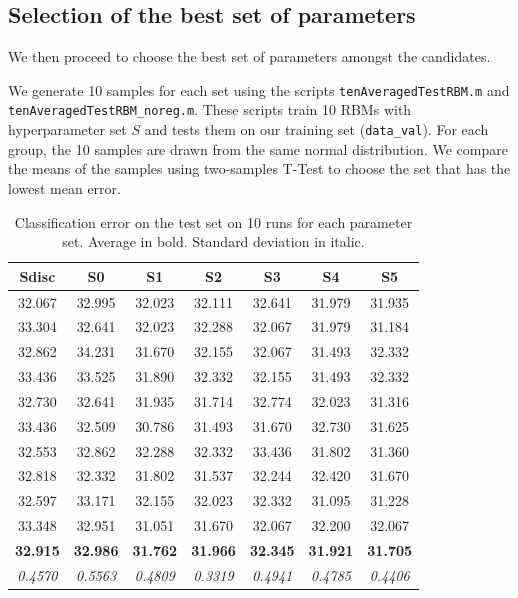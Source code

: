 \documentclass[10pt,a4paper, twocolumn]{article}
\theoremstyle{definition}
\begin{document}
\subsection{Selection of the best set of parameters}
We then proceed to choose the best set of parameters amongst the candidates.

We generate 10 samples for each set using the scripts \texttt{tenAveragedTestRBM.m} and \texttt{tenAveragedTestRBM\_noreg.m}. These scripts train 10 RBMs with hyperparameter set $S$ and tests them on our training set (\texttt{data\_val}). For each group, the 10 samples are drawn from the same normal distribution. We compare the means of the samples using two-samples T-Test to choose the set that has the lowest mean error.

\begin{table}
\resizebox{\columnwidth}{!} {
\begin{tabular}{|c|c|c|c|c|c|c|}
\hline
Sdisc & S0 & S1 & S2 & S3 & S4 & S5\\
\hline
32.067 & 32.995 & 32.023 & 32.111 & 32.641 & 31.979 & 31.935\\
33.304 & 32.641 & 32.023 & 32.288 & 32.067 & 31.979 & 31.184\\
32.862 & 34.231 & 31.670 & 32.155 & 32.067 & 31.493 & 32.332\\
33.436 & 33.525 & 31.890 & 32.332 & 32.155 & 31.493 & 32.332\\
32.730 & 32.641 & 31.935 & 31.714 & 32.774 & 32.023 & 31.316\\
33.436 & 32.509 & 30.786 & 31.493 & 31.670 & 32.730 & 31.625\\
32.553 & 32.862 & 32.288 & 32.332 & 33.436 & 31.802 & 31.360\\
32.818 & 32.332 & 31.802 & 31.537 & 32.244 & 32.420 & 31.670\\
32.597 & 33.171 & 32.155 & 32.023 & 32.332 & 31.095 & 31.228\\
33.348 & 32.951 & 31.051 & 31.670 & 32.067 & 32.200 & 32.067\\
\hline
\textbf{32.915} & \textbf{32.986} & \textbf{31.762} & \textbf{31.966} & \textbf{32.345} & \textbf{31.921} & \textbf{31.705}\\
\hline
\textit{0.4570}  &  \textit{0.5563}  &  \textit{0.4809}  &  \textit{0.3319} &   \textit{0.4941}  &  \textit{0.4785} &   \textit{0.4406}\\
\hline
\end{tabular}
}
\caption{Classification error on the test set on 10 runs for each parameter set. Average in bold. Standard deviation in italic.}
\end{table}
\end{document}
